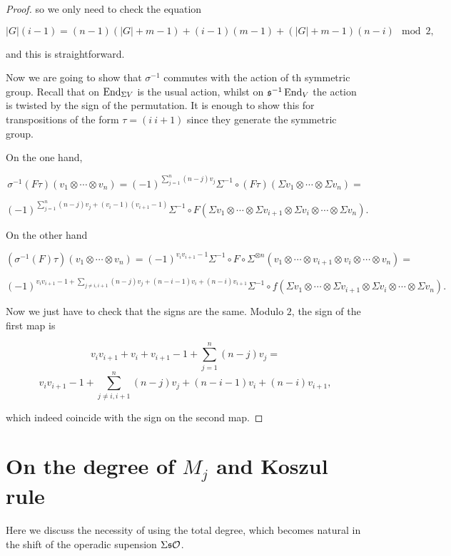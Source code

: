 \documentclass[twoside]{article}
\begin{document}
\begin{appendices}
\begin{proof}
so we only need to check the equation

$$|G|(i-1)=(n-1)(|G|+m-1)+(i-1)(m-1)+(|G|+m-1)(n-i)\mod 2,$$

and this is straightforward.

Now we are going to show that $\sigma^{-1}$ commutes with the action of th symmetric group. Recall that on $\operatorname{End}_{\Sigma V}$ is the usual action, whilst on $\mathfrak{s}^{-1}\operatorname{End}_V$ the action is twisted by the sign of the permutation. It is enough to show this for transpositions of the form $\tau=(i\ i+1)$ since they generate the symmetric group.

On the one hand, 

$$\sigma^{-1}(F\tau)(v_1\otimes\cdots\otimes v_n)=(-1)^{\sum_{j=1}^n (n-j)v_j}\Sigma^{-1}\circ (F\tau)(\Sigma v_1\otimes\cdots\otimes \Sigma v_n)=$$

$$(-1)^{\sum_{j=1}^n (n-j)v_j+(v_i-1)(v_{i+1}-1)}\Sigma^{-1}\circ F(\Sigma v_1\otimes\cdots\otimes\Sigma v_{i+1}\otimes\Sigma v_i\otimes\cdots\otimes \Sigma v_n).$$

On the other hand

$$(\sigma^{-1}(F)\tau) (v_1\otimes\cdots\otimes v_n)=(-1)^{v_iv_{i+1}-1}\Sigma^{-1}\circ F\circ \Sigma^{\otimes n}(v_1\otimes\cdots\otimes v_{i+1}\otimes v_i\otimes\cdots\otimes v_n)=$$

$$(-1)^{v_iv_{i+1}-1+\sum_{j\neq i,i+1}(n-j)v_j +(n-i-1)v_i+(n-i)v_{i+1}}\Sigma^{-1}\circ f(\Sigma v_1\otimes\cdots\otimes \Sigma v_{i+1}\otimes \Sigma v_i\otimes\cdots\otimes \Sigma v_n).$$

Now we just have to check that the signs are the same. Modulo $2$, the sign of the first map is

$$v_iv_{i+1}+v_i+v_{i+1}-1+\sum_{j=1}^n(n-j)v_j=$$
$$v_iv_{i+1}-1+\sum_{j\neq i,i+1}^n(n-j)v_j+(n-i-1)v_i+(n-i)v_{i+1},$$

which indeed coincide with the sign on the second map.

\end{proof}


\section{On the degree of $M_j$ and Koszul rule}\label{Ab1}

Here we discuss the necessity of using the total degree, which becomes natural in the shift of the operadic supension $\Sigma\mathfrak{s}{\mathcal O}$. 



\end{appendices}
\end{document}
